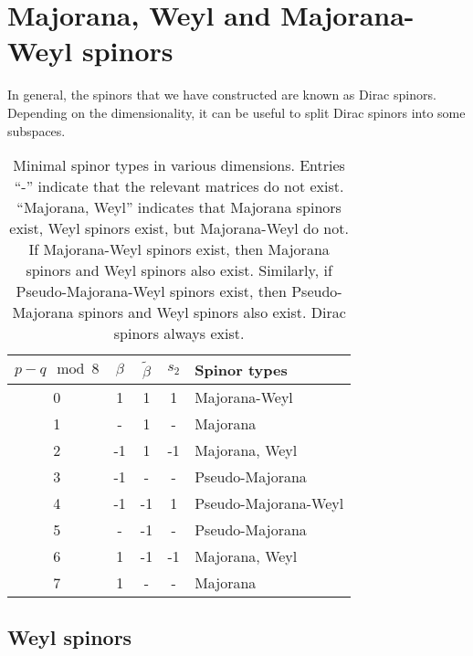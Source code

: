 \documentclass[11pt]{article}
\newcommand{\betat}{\tilde{\beta}}
\begin{document}

\section{Majorana, Weyl and Majorana-Weyl spinors}\label{sec:subtypes}

In general, the spinors that we have constructed are known as Dirac spinors.
Depending on the dimensionality, it can be useful to split Dirac spinors into some subspaces.


\begin{table}
  \centering
  \begin{tabular}{ccccl}
  \toprule
    $p-q \mod 8$ & $\beta$ & $\betat$ & $s_2$ & Spinor types  \\
  \midrule
    0 & 1  & 1  & 1  & Majorana-Weyl        \\
    1 & -  & 1  & -  & Majorana             \\
    2 & -1 & 1  & -1 & Majorana, Weyl       \\
    3 & -1 & -  & -  & Pseudo-Majorana      \\
    4 & -1 & -1 & 1  & Pseudo-Majorana-Weyl \\
    5 & -  & -1 & -  & Pseudo-Majorana      \\
    6 & 1  & -1 & -1 & Majorana, Weyl       \\
    7 & 1  & -  & -  & Majorana             \\
  \bottomrule
  \end{tabular}
  \caption{Minimal spinor types in various dimensions.
  Entries ``-'' indicate that the relevant matrices do not exist.
  ``Majorana, Weyl'' indicates that Majorana spinors exist, Weyl spinors exist, but Majorana-Weyl do not.
  If Majorana-Weyl spinors exist, then Majorana spinors and Weyl spinors also exist.
  Similarly, if Pseudo-Majorana-Weyl spinors exist, then Pseudo-Majorana spinors and Weyl spinors also exist.
  Dirac spinors always exist.
  }\label{tab:types}
\end{table}



\subsection{Weyl spinors}\label{sec:weyl}
\end{document}
